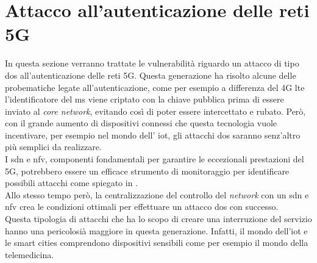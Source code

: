 \chapter{Attacco all'autenticazione delle reti 5G}
In questa sezione verranno trattate le vulnerabilità riguardo un attacco di tipo \gls{dos} all'autenticazione delle reti 5G.
Questa generazione ha risolto alcune delle probematiche legate all'autenticazione, come per esempio a differenza del 4G \gls{lte} l'identificatore 
del \gls{ms} viene criptato con la chiave pubblica prima di essere inviato al \textit{core network}, evitando così di poter essere intercettato e rubato\cite{5g-vs-4g}.
Però, con il grande aumento di dispositivi connessi che questa tecnologia vuole incentivare, per esempio nel mondo dell' \gls{iot}, gli attacchi \gls{dos} saranno senz'altro più 
semplici da realizzare.\\
I \gls{sdn} e \gls{nfv}, componenti fondamentali per garantire le eccezionali prestazioni del 5G, potrebbero essere un efficace strumento di monitoraggio per identificare possibili 
attacchi come spiegato in \cite{dos-detection-with-sdn}.\\
Allo stesso tempo però, la centralizzazione del controllo del \textit{network} con un \gls{sdn} e \gls{nfv} crea le condizioni ottimali per effettuare un attacco \gls{dos} con successo\cite{5g-dos}.\\
Questa tipologia di attacchi che ha lo scopo di creare una interruzione del servizio hanno una pericolosià maggiore in questa generazione. Infatti, il mondo dell'\gls{iot} e le smart cities comprendono 
dispositivi sensibili come per esempio il mondo della telemedicina.

\clearpage

